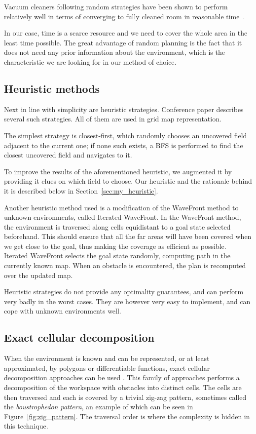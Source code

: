 \documentclass[buriama8_dp.tex]{subfiles}
\begin{document}
Vacuum cleaners following random strategies have been shown to perform relatively well in terms of converging to fully cleaned room in reasonable time~\cite{randomcover}.

In our case, time is a scarce resource and we need to cover the whole area in the least time possible. The great advantage of random planning is the fact that it does not need any prior information about the environment, which is the characteristic we are looking for in our method of choice.

\subsection{Heuristic methods}
\label{subsec:heuritic}
Next in line with simplicity are heuristic strategies. Conference paper \cite{rt_heuristic_coverage} describes several such strategies. All of them are used in grid map representation.

The simplest strategy is closest-first, which randomly chooses an uncovered field adjacent to the current one; if none such exists, a BFS is performed to find the closest uncovered field and navigates to it.

To improve the results of the aforementioned heuristic, we augmented it by providing it clues on which field to choose. Our heuristic and the rationale behind it is described below in Section~\ref{sec:my_heuristic}.

Another heuristic method used is a modification of the WaveFront method \cite{wavefront} to unknown environments, called Iterated WaveFront. In the WaveFront method, the environment is traversed along cells equidistant to a goal state selected beforehand. This should ensure that all the far areas will have been covered when we get close to the goal, thus making the coverage as efficient as possible. Iterated WaveFront selects the goal state randomly, computing path in the currently known map. When an obstacle is encountered, the plan is recomputed over the updated map.

Heuristic strategies do not provide any optimality guarantees, and can perform very badly in the worst cases. They are however very easy to implement, and can cope with unknown environments well. 

\subsection{Exact cellular decomposition}
\label{subsec:boustrop}
When the environment is known and can be represented, or at least approximated, by polygons or differentiable functions, exact cellular decomposition approaches can be used \cite{survey13}. This family of approaches performs a decomposition of the workspace with obstacles into distinct cells. The cells are then traversed and each is covered by a trivial zig-zag pattern, sometimes called the \textit{boustrophedon pattern}, an example of which can be seen in Figure~\ref{fig:zig_pattern}. The traversal order is where the complexity is hidden in this technique.
\end{document}
